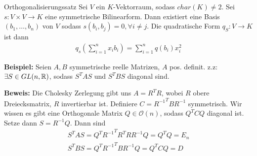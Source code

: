 \begin{nosatz}{Orthogonalisierungssatz}
    Sei $V$ ein $K$-Vektorraum, sodass $char(K) \neq 2$. Sei $s: V \times V \to K$ eine symmetrische Bilinearform. Dann existiert eine Basis $(b_{1}, \ldots, b_{n})$ von $V$ sodass $s(b_i,b_j) = 0, \forall i \neq j$.
    Die quadratische Form $q_S: V \to K$ ist dann
    \begin{align*}
        q_s \left(
            \sum_{i = 1}^{n} x_i b_i
        \right) = \sum_{i = 1}^{n} q(b_i)x_i^2
    \end{align*}
\end{nosatz}

\textbf{Beispiel:} Seien $A,B$ symmetrische reelle Matrizen, $A$ pos. definit. z.z: $\exists S \in GL(n,\mathbb{R})$, sodass $S^TAS$ und $S^TBS$ diagonal sind.

\textbf{Beweis:} \quad Die Cholesky Zerlegung gibt uns $A = R^TR$, wobei $R$ obere Dreiecksmatrix, $R$ invertierbar ist.
Definiere $C = {R^{-1}}^TBR^{-1}$ symmetrisch. Wir wissen es gibt eine Orthogonale Matrix $Q \in \mathcal{O}(n)$, sodass $Q^TCQ$ diagonal ist.
Setze dann $S = R^{-1}Q$. Dann sind 
\begin{align*}
    S^TAS = Q^T{R^{-1}}^TR^TRR^{-1}Q = Q^TQ = E_n\\
    S^TBS = Q^T{R^{-1}}^TBR^{-1}Q = Q^TCQ = D
\end{align*}

